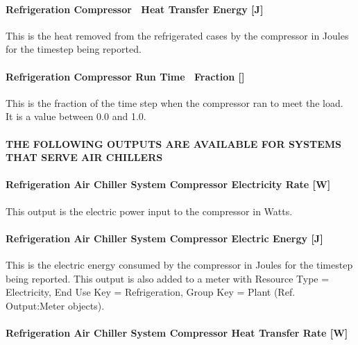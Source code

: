 \paragraph{Refrigeration Compressor~ Heat Transfer Energy {[}J{]}}\label{refrigeration-compressor-heat-transfer-energy-j}

This is the heat removed from the refrigerated cases by the compressor in Joules for the timestep being reported.

\paragraph{Refrigeration Compressor Run Time~ Fraction {[]}}\label{refrigeration-compressor-run-time-fraction}

This is the fraction of the time step when the compressor ran to meet the load.~ It is a value between 0.0 and 1.0.

\paragraph{THE FOLLOWING OUTPUTS ARE AVAILABLE FOR SYSTEMS THAT SERVE AIR CHILLERS}\label{the-following-outputs-are-available-for-systems-that-serve-air-chillers-1}

\paragraph{Refrigeration Air Chiller System Compressor Electricity Rate {[}W{]}}\label{refrigeration-air-chiller-system-compressor-electric-power-w}

This output is the electric power input to the compressor in Watts.

\paragraph{Refrigeration Air Chiller System Compressor Electric Energy {[}J{]}}\label{refrigeration-air-chiller-system-compressor-electric-energy-j}

This is the electric energy consumed by the compressor in Joules for the timestep being reported. This output is also added to a meter with Resource Type = Electricity, End Use Key = Refrigeration, Group Key = Plant (Ref. Output:Meter objects).

\paragraph{Refrigeration Air Chiller System Compressor Heat Transfer Rate {[}W{]}}\label{refrigeration-air-chiller-system-compressor-heat-transfer-rate-w}

